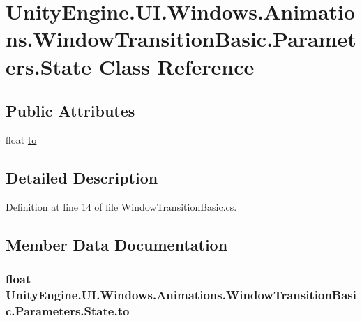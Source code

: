 \hypertarget{class_unity_engine_1_1_u_i_1_1_windows_1_1_animations_1_1_window_transition_basic_1_1_parameters_1_1_state}{}\section{Unity\+Engine.\+U\+I.\+Windows.\+Animations.\+Window\+Transition\+Basic.\+Parameters.\+State Class Reference}
\label{class_unity_engine_1_1_u_i_1_1_windows_1_1_animations_1_1_window_transition_basic_1_1_parameters_1_1_state}
\subsection*{Public Attributes}
\begin{DoxyCompactItemize}
\item 
float \hyperlink{class_unity_engine_1_1_u_i_1_1_windows_1_1_animations_1_1_window_transition_basic_1_1_parameters_1_1_state_ab32f65ce4fd80169ed09647cf6bb0718}{to}
\end{DoxyCompactItemize}


\subsection{Detailed Description}


Definition at line 14 of file Window\+Transition\+Basic.\+cs.



\subsection{Member Data Documentation}
\hypertarget{class_unity_engine_1_1_u_i_1_1_windows_1_1_animations_1_1_window_transition_basic_1_1_parameters_1_1_state_ab32f65ce4fd80169ed09647cf6bb0718}{}
\subsubsection[{to}]{\setlength{\rightskip}{0pt plus 5cm}float Unity\+Engine.\+U\+I.\+Windows.\+Animations.\+Window\+Transition\+Basic.\+Parameters.\+State.\+to}\label{class_unity_engine_1_1_u_i_1_1_windows_1_1_animations_1_1_window_transition_basic_1_1_parameters_1_1_state_ab32f65ce4fd80169ed09647cf6bb0718}


